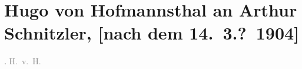 

         \renewcommand{\erwaehnteOrte}{Orte: Wien}
         \renewcommand{\erwaehnteWerke}{}
               \section[Hugo von Hofmannsthal an Arthur Schnitzler, {[}nach dem 14. 3.? 1904{]}]{ Hugo von Hofmannsthal an Arthur Schnitzler, {[}nach dem
               14. 3.? 1904{]}}\nopagebreak{}\rehead{ }\begin{ledgroupsized}[t]{13cm}\normalsize\beginnumbering \toendnotes[C]{\smallbreak\pagebreak[2]} \toendnotes[C]{\smallbreak}\pstart
           \noindent{}{\pb}\label{K_L01383_1v}\label{K_L01383_1h}.\pend
           \pstart \spacefill\mbox{\textcolor{gray}{H. v. H.}}\pend{}
         
         \endnumbering{}\end{ledgroupsized}  \newcommand{\dateiname}{L01383}\newcommand{\titel}{Hugo von Hofmannsthal an Arthur Schnitzler, [nach dem 14. 3.? 1904]}\newcommand{\editorInnen}{Martin Anton Müller und Gerd-Hermann Susen}
      